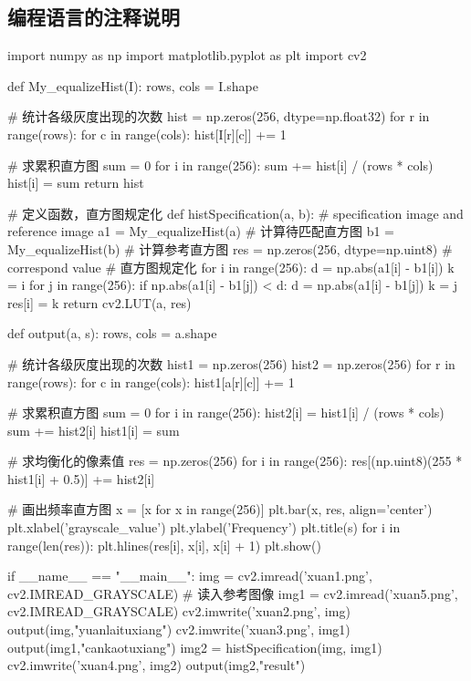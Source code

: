 \documentclass{article}
\begin{document}
\subsection{编程语言的注释说明}
\begin{python}
import numpy as np
import matplotlib.pyplot as plt
import cv2

def My_equalizeHist(I):
    rows, cols = I.shape

    # 统计各级灰度出现的次数
    hist = np.zeros(256, dtype=np.float32)
    for r in range(rows):
        for c in range(cols):
            hist[I[r][c]] += 1

    # 求累积直方图
    sum = 0
    for i in range(256):
        sum += hist[i] / (rows * cols)
        hist[i] = sum
    return hist

# 定义函数，直方图规定化
def histSpecification(a, b):  # specification image and reference image
    a1 = My_equalizeHist(a)  # 计算待匹配直方图
    b1 = My_equalizeHist(b)  # 计算参考直方图
    res = np.zeros(256, dtype=np.uint8)  # correspond value
    # 直方图规定化
    for i in range(256):
        d = np.abs(a1[i] - b1[i])
        k = i
        for j in range(256):
            if np.abs(a1[i] - b1[j]) < d:
                d = np.abs(a1[i] - b1[j])
                k = j
        res[i] = k
    return cv2.LUT(a, res)


def output(a, s):
    rows, cols = a.shape

    # 统计各级灰度出现的次数
    hist1 = np.zeros(256)
    hist2 = np.zeros(256)
    for r in range(rows):
        for c in range(cols):
            hist1[a[r][c]] += 1

    # 求累积直方图
    sum = 0
    for i in range(256):
        hist2[i] = hist1[i] / (rows * cols)
        sum += hist2[i]
        hist1[i] = sum

    # 求均衡化的像素值
    res = np.zeros(256)
    for i in range(256):
        res[(np.uint8)(255 * hist1[i] + 0.5)] += hist2[i]

    # 画出频率直方图
    x = [x for x in range(256)]
    plt.bar(x, res, align='center')
    plt.xlabel('grayscale_value')
    plt.ylabel('Frequency')
    plt.title(s)
    for i in range(len(res)):
        plt.hlines(res[i], x[i], x[i] + 1)
    plt.show()

if __name__ == "__main__":
    img = cv2.imread('xuan1.png', cv2.IMREAD_GRAYSCALE)
    # 读入参考图像
    img1 = cv2.imread('xuan5.png', cv2.IMREAD_GRAYSCALE)
    cv2.imwrite('xuan2.png', img)
    output(img,"yuanlaituxiang")
    cv2.imwrite('xuan3.png', img1)
    output(img1,"cankaotuxiang")
    img2 = histSpecification(img, img1)
    cv2.imwrite('xuan4.png', img2)
    output(img2,"result")

\end{python}
\end{document}
